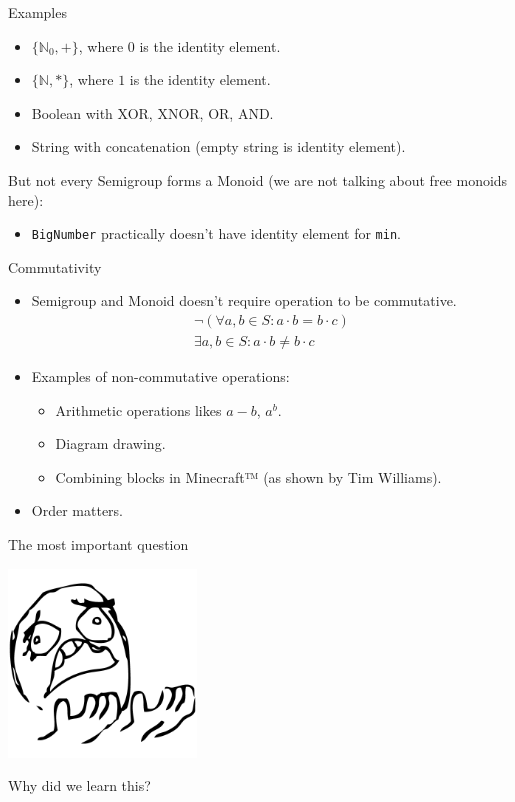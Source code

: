 \documentclass[presentation,aspectratio=169,smaller]{beamer}
\begin{document}
\begin{frame}[label={sec:orga1bcc8f},fragile]{Examples}
 \begin{itemize}
\item \(\{\mathbb{N}_0, +\}\), where \(0\) is the identity element.
\item \(\{\mathbb{N}, *\}\), where \(1\) is the identity element.
\item Boolean with XOR, XNOR, OR, AND.
\item String with concatenation (empty string is identity element).
\end{itemize}

\pause

But not every Semigroup forms a Monoid (we are not talking about free monoids
here):

\begin{itemize}
\item \texttt{BigNumber} practically doesn’t have identity element for \texttt{min}.
\end{itemize}
\end{frame}

\begin{frame}[label={sec:org84d3370}]{Commutativity}
\begin{itemize}
\item <1-> Semigroup and Monoid doesn't require operation to be commutative.
\begin{gather*}
  \neg(\forall a, b \in S : a \cdot b = b \cdot c) \\
  \exists a, b \in S : a \cdot b \ne b \cdot c
\end{gather*}

\item <2-> Examples of non-commutative operations:
\begin{itemize}
\item Arithmetic operations likes \(a - b\), \(a^b\).
\item Diagram drawing.
\item Combining blocks in Minecraft™ (as shown by Tim Williams).
\end{itemize}

\item <3-> Order matters.
\end{itemize}
\end{frame}

\begin{frame}[label={sec:org6c53edd}]{The most important question}
\pause

\begin{center}
\includegraphics[height=5cm]{images/whyyy.png}
\end{center}

Why did we learn this?
\end{frame}
\end{document}
